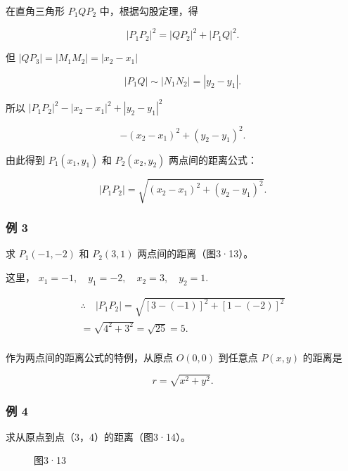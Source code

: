 在直角三角形 \(P_{1}QP_{2}\) 中，根据勾股定理，得

\[
\left| P _ {1} P _ {2} \right| ^ {2} = \left| Q P _ {2} \right| ^ {2} + \left| P _ {1} Q \right| ^ {2}.
\]

但 \(|QP_{3}| = |M_{1}M_{2}| = |x_{2} - x_{1}|\)

\[
\left| P _ {1} Q \right| \sim \left| N _ {1} N _ {2} \right| = \left| y _ {2} - y _ {1} \right|.
\]

所以 \(|P_{1}P_{2}|^{2} - |x_{2} - x_{1}|^{2} + |y_{2} - y_{1}|^{2}\)

\[
- \left(x _ {2} - x _ {1}\right) ^ {2} + \left(y _ {2} - y _ {1}\right) ^ {2}.
\]

由此得到 \(P_{1}(x_{1},y_{1})\) 和 \(P_{2}(x_{2},y_{2})\)
两点间的距离公式：

\[
\boxed {| P _ {1} P _ {2} | = \sqrt {(x _ {2} - x _ {1}) ^ {2} + (y _ {2} - y _ {1}) ^ {2}}.}
\]

\subsubsection{例 3}

求 \(P_{1}(-1, -2)\) 和 \(P_{2}(3, 1)\) 两点间的距离（图3·13）。

 这里，
\(x_{1}=-1,\quad y_{1}=-2,\quad x_{2}=3,\quad y_{2}=1.\)

\[
\begin{array}{l} \therefore \quad | P _ {1} P _ {2} | = \sqrt {[ 3 - (- 1) ] ^ {2} + [ 1 - (- 2) ] ^ {2}} \\ = \sqrt {4 ^ {2} + 3 ^ {2}} = \sqrt {25} = 5. \\ \end{array}
\]

作为两点间的距离公式的特例，从原点 \(O(0,0)\) 到任意点 \(P(x,y)\)
的距离是

\[
r = \sqrt {x ^ {2} + y ^ {2}}.
\]

\subsubsection{例 4}

求从原点到点（3，4）的距离（图3·14）。

\begin{figure}
\centering
{}
\caption{图3·13}
\end{figure}


